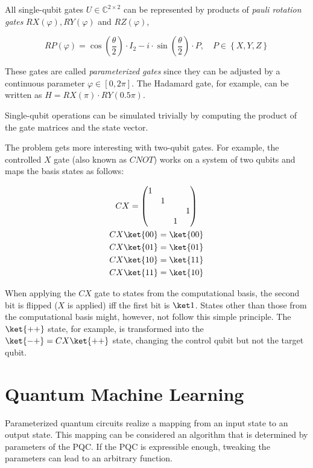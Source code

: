 All single-qubit gates $U \in \mathbb{C}^{2 \times 2}$ can be represented by
products of \emph{pauli rotation gates} $RX(\varphi), RY(\varphi)$ and
$RZ(\varphi)$,

\begin{equation}
    \label{eq:rotational-pauli-gates}
    RP\left(\varphi\right) = \cos\left(\frac\theta2\right) \cdot I_2 - i \cdot \sin\left(\frac\theta2\right) \cdot P,\quad
    P \in \left\{X, Y, Z\right\}
\end{equation}

These gates are called \emph{parameterized gates} since they can be adjusted by a
continuous parameter $\varphi \in \left[0, 2\pi\right]$.
The Hadamard gate, for example, can be written as
$H = RX(\pi) \cdot RY(0.5\pi)$.

Single-qubit operations can be simulated trivially by computing the product of
the gate matrices and the state vector.

The problem gets more interesting with two-qubit gates.
For example, the controlled $X$ gate (also known as $CNOT$) works on a system
of two qubits and maps the basis states as follows:

\begin{gather}
    \label{eq:cx-zbasis}
    CX = \begin{pmatrix}
        1&&&\\
        &1&&\\
        &&&1\\
        &&1&
    \end{pmatrix}\\
    CX \ket{00} = \ket{00}\\
    CX \ket{01} = \ket{01}\\
    CX \ket{10} = \ket{11}\\
    CX \ket{11} = \ket{10}
\end{gather}

When applying the $CX$ gate to states from the computational basis, the second
bit is flipped ($X$ is applied) iff the first bit is $\ket 1$.
States other than those from the computational basis might, however, not follow
this simple principle.
The $\ket{++}$ state, for example, is transformed into the
$\ket{-+} = CX \ket{++}$ state, changing the control qubit but not the target
qubit.

\section{Quantum Machine Learning}
Parameterized quantum circuits realize a mapping from an input state to an
output state.
This mapping can be considered an algorithm that is determined by parameters of
the PQC.
If the PQC is expressible enough, tweaking the parameters can lead to an
arbitrary function.


